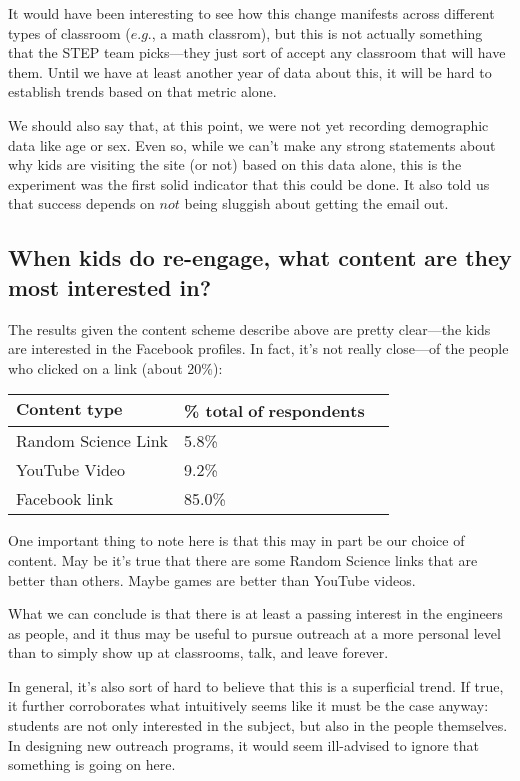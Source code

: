 \documentclass[11pt,a4paper]{article}
\begin{document}
It would have been interesting to see how this change manifests across different types of classroom ($\textit{e.g.}$, a math classrom), but this is not actually something that the STEP team picks---they just sort of accept any classroom that will have them. Until we have at least another year of data about this, it will be hard to establish trends based on that metric alone.

We should also say that, at this point, we were not yet recording demographic data like age or sex. Even so, while we can't make any strong statements about why kids are visiting the site (or not) based on this data alone, this is the experiment was the first solid indicator that this could be done. It also told us that success depends on $\textit{not}$ being sluggish about getting the email out.

\subsection{When kids do re-engage, what content are they most interested in?}

The results given the content scheme describe above are pretty clear---the kids are interested in the Facebook profiles. In fact, it's not really close---of the people who clicked on a link (about 20\%):

\begin{center}
\begin{tabular}{l | l c }
   $\textbf{Content type}$ & \% $\textbf{total of respondents}$ \\
   \hline
   Random Science Link & 5.8\% \\
   YouTube Video & 9.2\% \\
   Facebook link & 85.0\% \\
\end{tabular}
\end{center}

One important thing to note here is that this may in part be our choice of content. May be it's true that there are some Random Science links that are better than others. Maybe games are better than YouTube videos.

What we can conclude is that there is at least a passing interest in the engineers as people, and it thus may be useful to pursue outreach at a more personal level than to simply show up at classrooms, talk, and leave forever.

In general, it's also sort of hard to believe that this is a superficial trend. If true, it further corroborates what intuitively seems like it must be the case anyway: students are not only interested in the subject, but also in the people themselves. In designing new outreach programs, it would seem ill-advised to ignore that something is going on here.
\end{document}
